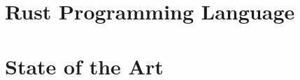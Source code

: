 \section{Rust Programming Language}\label{sec:rust}

\section{State of the Art}\label{sec:state-of-the-art}